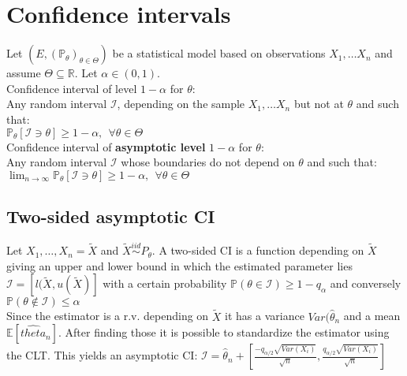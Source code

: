 \section{Confidence intervals}

Let $\displaystyle ( E,(\mathbb{P}_{\theta })_{\theta \in \Theta })$ be a statistical  model based on observations $X_{1} , \ldots X_{n}$  and assume $\displaystyle \Theta \subseteq \mathbb{R}$. Let $\displaystyle \alpha \in ( 0,1)$.\\

Confidence interval of level $\displaystyle 1-\alpha $ for $\displaystyle \theta $:\\

Any random interval $\displaystyle \mathcal{I}$, depending on the sample $X_{1} , \ldots X_{n}$ but not at $\displaystyle \theta $ and such that:\\

$\mathbb{P}_{\theta }[\mathcal{I} \ni \theta ] \geq 1-\alpha ,\ \ \forall \theta \in \Theta$\\

Confidence interval of \textbf{asymptotic level} $\displaystyle 1-\alpha $  for $\displaystyle \theta $:\\

Any random interval $\displaystyle \mathcal{I}$ whose boundaries do not depend on $\displaystyle \theta $ and such that:\\

$\lim _{n\rightarrow \infty }\mathbb{P}_{\theta } [\mathcal{I} \ni \theta ]\geq 1-\alpha ,\ \ \forall \theta \in \Theta $\\

\subsection*{Two-sided asymptotic CI}
Let $X_1, \ldots, X_n = \tilde{X}$ and $\tilde{X}\stackrel{iid} {\sim} P_{\theta}$. A two-sided CI is a function depending on $\tilde{X}$ giving an upper and lower bound in which the estimated parameter lies $\mathcal{I} = [l(\tilde{X},u(\tilde{X})]$ with a certain probability $\mathbb{P}(\theta \in  \mathcal{I}) \geq 1 -q_{\alpha}$ and conversely $\mathbb{P}(\theta \not\in  \mathcal{I}) \leq \alpha$\\

Since the estimator is a r.v. depending on $\tilde{X}$ it has a variance $Var(\hat{\theta}_n$ and a mean $\mathbb{E}[\hat{theta}_n]$. After finding those it is possible to standardize the estimator using the CLT. This yields an asymptotic CI: $\mathcal{I} = \hat{\theta}_n + [\frac{-q_{\alpha /2} \sqrt{Var(X_i)} }{\sqrt{n}}, \frac{q_{\alpha /2} \sqrt{Var(X_i)} }{\sqrt{n}}]$

